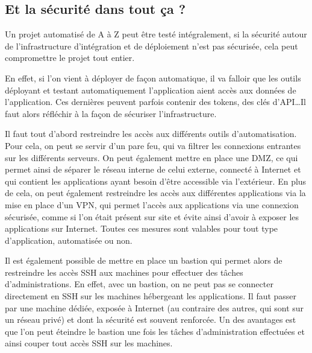 


\subsection{Et la sécurité dans tout ça ?}

Un projet automatisé de A à Z peut être testé intégralement, si la sécurité autour de l'infrastructure d'intégration et de déploiement n'est pas sécurisée, cela peut compromettre le projet tout entier.

En effet, si l'on vient à déployer de façon automatique, il va falloir que les outils déployant et testant automatiquement l'application aient accès aux données de l'application. Ces dernières peuvent parfois contenir des tokens, des clés d'\gls{API}\ldots Il faut alors réfléchir à la façon de sécuriser l'infrastructure. 

Il faut tout d'abord restreindre les accès aux différents outils d'automatisation. Pour cela, on peut se servir d'un pare feu, qui va filtrer les connexions entrantes sur les différents serveurs. On peut également mettre en place une \gls{DMZ}, ce qui permet ainsi de séparer le réseau interne de celui externe, connecté à Internet et qui contient les applications ayant besoin d'être accessible via l'extérieur. En plus de cela, on peut également restreindre les accès aux différentes applications via la mise en place d'un \gls{VPN}, qui permet l'accès aux applications via une connexion sécurisée, comme si l'on était présent sur site et évite ainsi d'avoir à exposer les applications sur Internet. Toutes ces mesures sont valables pour tout type d'application, automatisée ou non. 

Il est également possible de mettre en place un bastion qui permet alors de restreindre les accès \gls{SSH} aux machines pour effectuer des tâches d'administrations. En effet, avec un bastion, on ne peut pas se connecter directement en \gls{SSH} sur les machines hébergeant les applications. Il faut passer par une machine dédiée, exposée à Internet (au contraire des autres, qui sont sur un réseau privé) et dont la sécurité est souvent renforcée. Un des avantages est que l'on peut éteindre le bastion une fois les tâches d'administration effectuées et ainsi couper tout accès \gls{SSH} sur les machines.

